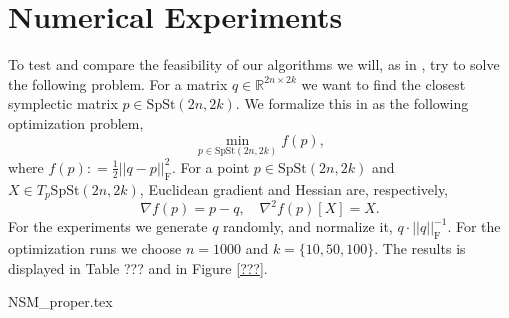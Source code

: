 \section{Numerical Experiments}
To test and compare the feasibility of our algorithms we will, as in \cite[p.~15]{JensenZimmermann2024}, try to solve the following problem. For a matrix $q\in \mathbb{R}^{2n\times2k}$ we want to find the closest symplectic matrix $p \in \mathrm{SpSt}(2n, 2k)$. We formalize this in as the following optimization problem, 
%
\begin{equation}
\operatorname*{min}_{p \in \mathrm{SpSt}(2n, 2k)}f(p),
\end{equation}
%
where $f(p)\colon=\tfrac{1}{2}\lvert \lvert q-p \rvert \rvert^{2}_{\text{F}}$. For a point $p\in \mathrm{SpSt}(2n, 2k)$ and $X\in T_{p}\mathrm{SpSt}(2n, 2k)$, Euclidean gradient and Hessian are, respectively,
%
\begin{equation*}
\nabla f(p)=p-q,\quad \nabla^{2}f(p)[X]=X.
\end{equation*}
%
For the experiments we generate $q$ randomly, and normalize it, $q\cdot\lvert \lvert q \rvert \rvert^{-1}_{\text{F}}$. For the optimization runs we choose $n=1000$ and $k=\{10,50,100\}$. The results is displayed in Table {???} and in Figure \ref{???}. 

{NSM_proper.tex}
